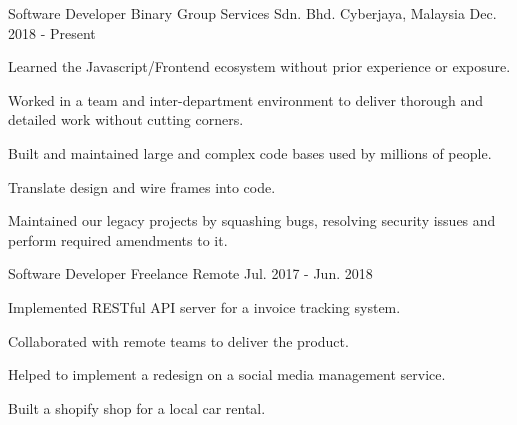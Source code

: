 

\begin{cventries}

  \cventry
    {Software Developer} %
    {Binary Group Services Sdn. Bhd.} %
    {Cyberjaya, Malaysia} %
    {Dec. 2018 - Present} %
    {
      \begin{cvitems} %
        \item {Learned the Javascript/Frontend ecosystem without prior experience or exposure.}
        \item {Worked in a team and inter-department environment to deliver thorough and detailed work without cutting corners.}
        \item {Built and maintained large and complex code bases used by millions of people.}
        \item {Translate design and wire frames into code.}
        \item {Maintained our legacy projects by squashing bugs, resolving security issues and perform required amendments to it.}
      \end{cvitems}
    }

  \cventry
    {Software Developer} %
    {Freelance} %
    {Remote} %
    {Jul. 2017 - Jun. 2018} %
    {
      \begin{cvitems} %
        \item {Implemented RESTful API server for a invoice tracking system.}
        \item {Collaborated with remote teams to deliver the product.}
        \item {Helped to implement a redesign on a social media management service.}
        \item {Built a shopify shop for a local car rental.}
      \end{cvitems}
    }
\end{cventries}
